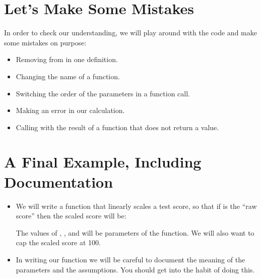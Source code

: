 \documentclass[letterpaper,10pt,english]{sphinxmanual}
\begin{document}
\section{Let’s Make Some Mistakes}
\label{\detokenize{lecture_notes/lec05_functions2:lets-make-some-mistakes}}
In order to check our understanding, we will play around with the code
and make some mistakes on purpose:
\begin{itemize}
\item {} 
Removing  from  in one definition.

\item {} 
Changing the name of a function.

\item {} 
Switching the order of the parameters in a function call.

\item {} 
Making an error in our calculation.

\item {} 
Calling  with the result of a function that does not
return a value.

\end{itemize}


\section{A Final Example, Including Documentation}
\label{\detokenize{lecture_notes/lec05_functions2:a-final-example-including-documentation}}\begin{itemize}
\item {} 
We will write a function that linearly scales a test score, so that
if  is the “raw score” then the scaled score will be:

\begin{sphinxVerbatim}[commandchars=\\\{\}]
      
\end{sphinxVerbatim}

The values of , , and  will be parameters of the
function.  We will also want to cap the scaled score at 100.

\item {} 
In writing our function we will be careful to document the meaning of
the parameters and the assumptions.  You should get into the habit
of doing this.

\end{itemize}
\end{document}
